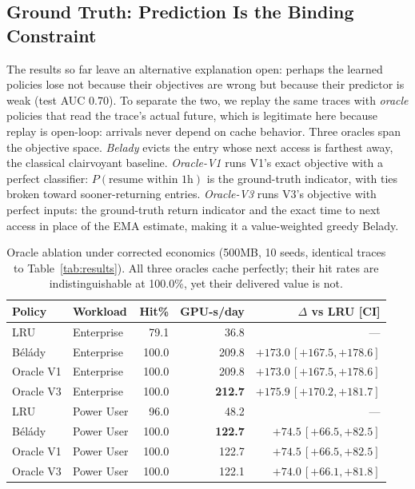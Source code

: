 \documentclass[letterpaper,twocolumn,10pt]{article}
\begin{document}
\subsection{Ground Truth: Prediction Is the Binding Constraint}
\label{sec:oracle}

The results so far leave an alternative explanation open: perhaps the learned policies lose not because their objectives are wrong but because their predictor is weak (test AUC 0.70). To separate the two, we replay the same traces with \emph{oracle} policies that read the trace's actual future, which is legitimate here because replay is open-loop: arrivals never depend on cache behavior. Three oracles span the objective space. \emph{Belady} evicts the entry whose next access is farthest away, the classical clairvoyant baseline. \emph{Oracle-V1} runs V1's exact objective with a perfect classifier: $P(\text{resume within 1h})$ is the ground-truth indicator, with ties broken toward sooner-returning entries. \emph{Oracle-V3} runs V3's objective with perfect inputs: the ground-truth return indicator and the exact time to next access in place of the EMA estimate, making it a value-weighted greedy Belady.

\begin{table}[t]
\centering
\caption{Oracle ablation under corrected economics (500MB, 10 seeds, identical traces to Table~\ref{tab:results}). All three oracles cache perfectly; their hit rates are indistinguishable at 100.0\%, yet their delivered value is not.}
\label{tab:oracle}
\footnotesize
\setlength{\tabcolsep}{2pt}
\begin{tabular}{@{}llrrr@{}}
\toprule
Policy & Workload & Hit\% & GPU-s/day & $\Delta$ vs LRU [CI] \\
\midrule
LRU              & Enterprise & 79.1  & 36.8  & --- \\
B\'{e}l\'{a}dy   & Enterprise & 100.0 & 209.8 & $+173.0$\,$[+167.5,+178.6]$ \\
Oracle V1        & Enterprise & 100.0 & 209.8 & $+173.0$\,$[+167.5,+178.6]$ \\
Oracle V3        & Enterprise & 100.0 & \textbf{212.7} & $+175.9$\,$[+170.2,+181.7]$ \\
\midrule
LRU              & Power User & 96.0  & 48.2  & --- \\
B\'{e}l\'{a}dy   & Power User & 100.0 & \textbf{122.7} & $+74.5$\,$[+66.5,+82.5]$ \\
Oracle V1        & Power User & 100.0 & 122.7 & $+74.5$\,$[+66.5,+82.5]$ \\
Oracle V3        & Power User & 100.0 & 122.1 & $+74.0$\,$[+66.1,+81.8]$ \\
\bottomrule
\end{tabular}
\end{table}
\end{document}
